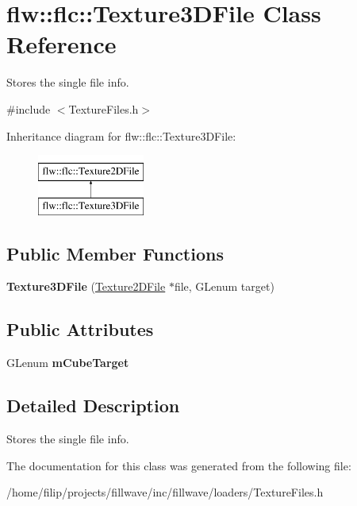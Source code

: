 \hypertarget{classflw_1_1flc_1_1Texture3DFile}{}\section{flw\+:\+:flc\+:\+:Texture3\+D\+File Class Reference}
\label{classflw_1_1flc_1_1Texture3DFile}


Stores the single file info.  




{\ttfamily \#include $<$Texture\+Files.\+h$>$}

Inheritance diagram for flw\+:\+:flc\+:\+:Texture3\+D\+File\+:\begin{figure}[H]
\begin{center}
\leavevmode
\includegraphics[height=2.000000cm]{classflw_1_1flc_1_1Texture3DFile}
\end{center}
\end{figure}
\subsection*{Public Member Functions}
\begin{DoxyCompactItemize}
\item 
\mbox{\label{classflw_1_1flc_1_1Texture3DFile_a15af8ed7c04a59c6e1ff109dd695617c}} 
{\bfseries Texture3\+D\+File} (\hyperlink{classflw_1_1flc_1_1Texture2DFile}{Texture2\+D\+File} $\ast$file, G\+Lenum target)
\end{DoxyCompactItemize}
\subsection*{Public Attributes}
\begin{DoxyCompactItemize}
\item 
\mbox{\label{classflw_1_1flc_1_1Texture3DFile_af90bf6759f1b4ca1969014f866eecf7a}} 
G\+Lenum {\bfseries m\+Cube\+Target}
\end{DoxyCompactItemize}


\subsection{Detailed Description}
Stores the single file info. 

The documentation for this class was generated from the following file\+:\begin{DoxyCompactItemize}
\item 
/home/filip/projects/fillwave/inc/fillwave/loaders/Texture\+Files.\+h\end{DoxyCompactItemize}
